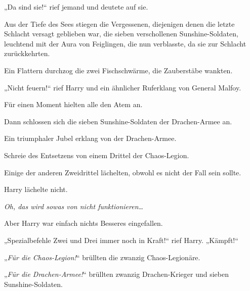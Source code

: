 „Da sind sie!“ rief jemand und deutete auf sie.

Aus der Tiefe des Sees stiegen die Vergessenen, diejenigen denen die letzte Schlacht versagt geblieben war, die sieben verschollenen Sunshine-Soldaten, leuchtend mit der Aura von Feiglingen, die nun verblasste, da sie zur Schlacht zurückkehrten.

Ein Flattern durchzog die zwei Fischschwärme, die Zauberstäbe wankten.

„Nicht feuern!“ rief Harry und ein ähnlicher Ruferklang von General Malfoy.

Für einen Moment hielten alle den Atem an.

Dann schlossen sich die sieben Sunshine-Soldaten der Drachen-Armee an.

Ein triumphaler Jubel erklang von der Drachen-Armee.

Schreie des Entsetzens von einem Drittel der Chaos-Legion.

Einige der anderen Zweidrittel lächelten, obwohl es nicht der Fall sein sollte.

Harry lächelte nicht.

\emph{Oh, das wird sowas von nicht funktionieren…}

Aber Harry war einfach nichts Besseres eingefallen.

„Spezialbefehle Zwei und Drei immer noch in Kraft!“ rief Harry. „Kämpft!“

„\emph{Für die Chaos-Legion!}“ brüllten die zwanzig Chaos-Legionäre.

„\emph{Für die Drachen-Armee!}“ brüllten zwanzig Drachen-Krieger und sieben Sunshine-Soldaten.

